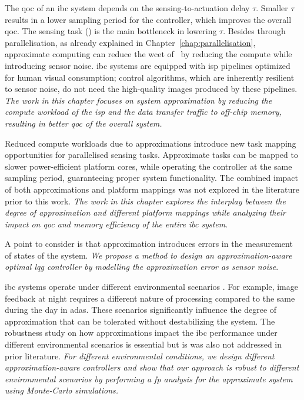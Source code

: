 \par The \gls{qoc} of an \gls{ibc} system depends on the sensing-to-actuation delay $\tau$. Smaller $\tau$ results in a lower sampling period for the controller, which improves the overall \gls{qoc}. The sensing task (\taskS) is the main bottleneck in lowering $\tau$.
Besides through parallelisation, as already explained in Chapter~\ref{chap:parallelisation}, approximate computing can reduce the \gls{wcet} of \taskS\ by reducing the compute  while introducing sensor noise. \gls{ibc} systems are equipped with \gls{isp} pipelines optimized for human visual consumption; control algorithms, which are inherently resilient to sensor noise, do not need the high-quality images produced by these pipelines. \textit{The work in this chapter focuses on system approximation by reducing the compute workload of the \gls{isp} and the data transfer traffic to off-chip memory, resulting in better \gls{qoc} of the overall system.}

\par  Reduced compute workloads due to approximations introduce new task mapping opportunities for parallelised sensing tasks. Approximate tasks can be mapped to slower power-efficient platform cores, while operating the controller at the same sampling period, guaranteeing proper system functionality.   
The combined impact of both approximations and platform mappings was not explored in the literature prior to this work. 
\textit{The work in this chapter explores the interplay between the degree of approximation and different platform mappings while analyzing their impact on \gls{qoc} and memory efficiency of the entire \gls{ibc} system}. 

A point to consider is that approximation introduces errors in the measurement of states of the system.
\textit{We propose a method to design an approximation-aware optimal \gls{lqg} controller by modelling the approximation error as sensor noise}. 

\par \gls{ibc} systems operate under different environmental scenarios \cite{env_cond}. For example, image feedback at night requires a different nature of processing compared to the same during the day in \gls{adas}. These scenarios significantly influence the degree of approximation that can be tolerated without destabilizing the system. The robustness study on how approximations impact the \gls{ibc} performance under different environmental scenarios is essential but is was also not addressed in prior literature. 
\textit{For different environmental conditions, we design different approximation-aware controllers and show that our approach is robust to different environmental scenarios by performing a \gls{fp} analysis for the approximate system using Monte-Carlo simulations.}   

